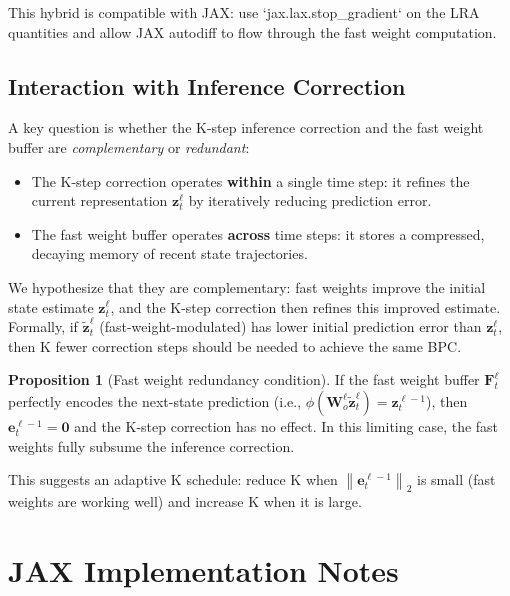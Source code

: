 \documentclass[11pt]{article}
\theoremstyle{definition}
\newtheorem{proposition}{Proposition}[section]
\newcommand{\vz}{\mathbf{z}}
\newcommand{\ve}{\mathbf{e}}
\newcommand{\W}{\mathbf{W}}
\newcommand{\norm}[1]{\left\|#1\right\|}
\begin{document}
This hybrid is compatible with JAX: use `jax.lax.stop_gradient` on the LRA quantities
and allow JAX autodiff to flow through the fast weight computation.

\subsection{Interaction with Inference Correction}

A key question is whether the K-step inference correction and the fast weight
buffer are \emph{complementary} or \emph{redundant}:

\begin{itemize}
  \item The K-step correction operates \textbf{within} a single time step:
    it refines the current representation $\vz^\ell_t$ by iteratively reducing
    prediction error.
  \item The fast weight buffer operates \textbf{across} time steps:
    it stores a compressed, decaying memory of recent state trajectories.
\end{itemize}

We hypothesize that they are complementary: fast weights improve the initial
state estimate $\vz^\ell_t$, and the K-step correction then refines this
improved estimate. Formally, if $\tilde{\vz}^\ell_t$ (fast-weight-modulated)
has lower initial prediction error than $\vz^\ell_t$, then K fewer correction
steps should be needed to achieve the same BPC.

\begin{proposition}[Fast weight redundancy condition]
If the fast weight buffer $\mathbf{F}^\ell_t$ perfectly encodes the next-state
prediction (i.e., $\phi(\W^\ell_o \tilde{\vz}^\ell_t) = \vz^{\ell-1}_t$), then
$\ve^{\ell-1}_t = \mathbf{0}$ and the K-step correction has no effect. In this
limiting case, the fast weights fully subsume the inference correction.
\end{proposition}

This suggests an adaptive K schedule: reduce K when $\norm{\ve^{\ell-1}_t}_2$
is small (fast weights are working well) and increase K when it is large.

\section{JAX Implementation Notes}
\end{document}
